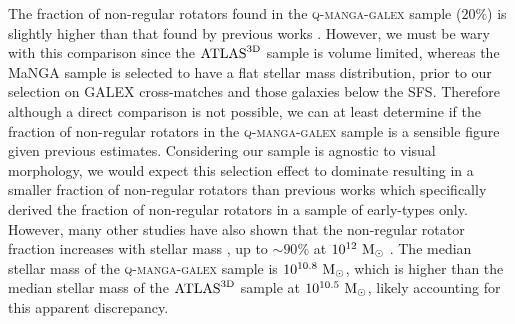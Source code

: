 \documentclass[useAMS,usenatbib]{mn2e}
\def\minor		{\color{minorcol}}
\begin{document}
The fraction of non-regular rotators found in the \textsc{q-manga-galex} sample ($20\%$) is slightly higher than that found by previous works \citep[$14-17\%$ of early-types in the $\rm{ATLAS}^{\rm{3D}}$ sample; ][]{emsellem11, stott16}. {\minor However, we must be wary with this comparison since the $\rm{ATLAS}^{\rm{3D}}$ sample is volume limited, whereas the MaNGA sample is selected to have a flat stellar mass distribution, prior to our selection on GALEX cross-matches and those galaxies below the SFS. Therefore although a direct comparison is not possible, we can at least determine if the fraction of non-regular rotators in the  \textsc{q-manga-galex} sample is a sensible figure given previous estimates.} Considering our sample is agnostic to visual morphology, {\minor we would  expect this selection effect to dominate resulting in a} smaller fraction of non-regular rotators than previous works which specifically derived the fraction of non-regular rotators in a sample of early-types only. However, many other studies have also shown that the non-regular rotator fraction increases with stellar mass \citep{cappellari13}, up to $\sim90\%$ at $10^{12}~\rm{M}_{\odot}$ \citep{veale17}. The median stellar mass of the \textsc{q-manga-galex} sample is $10^{10.8}~\rm{M}_{\odot}$, which is higher than the median stellar mass of the $\rm{ATLAS}^{\rm{3D}}$ sample at $10^{10.5}~\rm{M}_{\odot}$, likely accounting for this apparent discrepancy.
\end{document}
